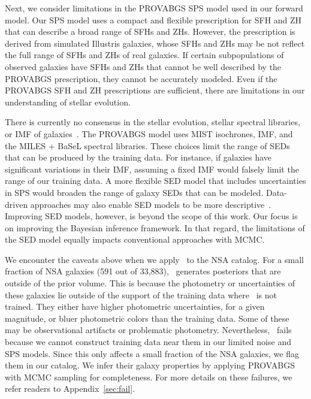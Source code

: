 Next, we consider limitations in the PROVABGS SPS model used in our forward
model. 
Our SPS model uses a compact and flexible prescription for SFH and ZH that can
describe a broad range of SFHs and ZHs.
However, the prescription is derived from simulated Illustris galaxies, whose
SFHs and ZHs may be not reflect the full range of SFHs and ZHs of real
galaxies.
If certain subpopulations of observed galaxies have SFHs and ZHs that cannot be
well described by the PROVABGS prescription, they cannot be accurately modeled.
Even if the PROVABGS SFH and ZH prescriptions are sufficient, there are
limitations in our understanding of stellar evolution. 

There is currently no consensus in the stellar evolution, stellar spectral
libraries, or IMF of galaxies~\citep[\emph{e.g.}][]{treu2010, vandokkum2010,
rosani2018, ge2019, sonnenfeld2019}.
The PROVABGS model uses MIST isochrones, \cite{chabrier2003} IMF, and the MILES
+ BaSeL spectral libraries. 
These choices limit the range of SEDs that can be produced by the training
data. 
For instance, if galaxies have significant variations in their IMF, assuming a
fixed IMF would falsely limit the range of our training data.  
A more flexible SED model that includes uncertainties in SPS would broaden the
range of galaxy SEDs that can be modeled.
Data-driven approaches may also enable SED models to be more
descriptive~\citep[\emph{e.g.}][]{hogg2016, portillo2020}. 
Improving  SED models, however, is beyond the scope of this work. 
Our focus is on improving the Bayesian inference framework.
In that regard, the limitations of the SED model equally impacts conventional
approaches with MCMC. 

We encounter the caveats above when we apply \sedflow~to the NSA catalog. 
For a small fraction of NSA galaxies (591 out of 33,883), \sedflow~generates
posteriors that are outside of the prior volume. 
This is because the photometry or uncertainties of these galaxies lie outside
of the support of the training data where \sedflow~is not trained. 
They either have higher photometric uncertainties, for a given magnitude, or
bluer photometric colors than the training data. 
Some of these may be observational artifacts or problematic photometry.
Nevertheless, \sedflow~fails because we cannot construct training data near
them in our limited noise and SPS models. 
Since this only affects a small fraction of the NSA galaxies, we flag them in
our catalog. 
We infer their galaxy properties by applying PROVABGS with MCMC sampling for
completeness.
For more details on these failures, we refer readers to
Appendix~\ref{sec:fail}.

